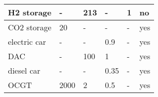 \documentclass[11pt,a4paper,fleqn]{scrartcl}
\begin{document}
\begin{table}[]
\begin{tabular}{llllll}
		\rowcolor[HTML]{EFEFEF} 
		H2 storage          & -                                                                            & 213                                                                            & -                                                                            & 1                                                                                                      & no                                                                   \\ \hline
		CO2 storage         & 20                                                                           & -                                                                              & -                                                                            & -                                                                                                      & yes                                                                  \\ \hline
		\rowcolor[HTML]{EFEFEF} 
		electric car        & -                                                                            & -                                                                              & 0.9                                                                          & -                                                                                                      & yes                                                                  \\ \hline
		DAC                 & -                                                                            & 100                                                                            & 1                                                                            & -                                                                                                      & yes                                                                  \\ \hline
		\rowcolor[HTML]{EFEFEF} 
		diesel car          & -                                                                            & -                                                                              & 0.35                                                                         & -                                                                                                      & yes                                                                  \\ \hline
		OCGT                & 2000                                                                         & 2                                                                              & 0.5                                                                          & -                                                                                                      & yes                                                                  \\ \hline
	\end{tabular}
\end{table}
\end{document}
